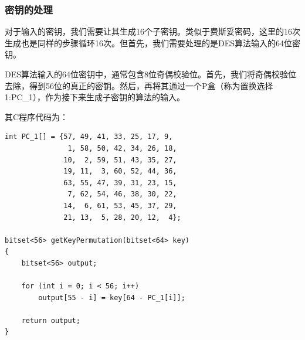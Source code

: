 \subsubsection{密钥的处理}
对于输入的密钥，我们需要让其生成16个子密钥。类似于费斯妥密码，这里的16次生成也是同样的步骤循环16次。但首先，我们需要处理的是DES算法输入的64位密钥。\par
DES算法输入的64位密钥中，通常包含8位奇偶校验位。首先，我们将奇偶校验位去除，得到56位的真正的密钥。然后，再将其通过一个P盒（称为置换选择1:PC\_1），作为接下来生成子密钥的算法的输入。\par
其C程序代码为：
\begin{prove}
\begin{verbatim}
int PC_1[] = {57, 49, 41, 33, 25, 17, 9,
               1, 58, 50, 42, 34, 26, 18,
              10,  2, 59, 51, 43, 35, 27,
              19, 11,  3, 60, 52, 44, 36,
              63, 55, 47, 39, 31, 23, 15,
               7, 62, 54, 46, 38, 30, 22,
              14,  6, 61, 53, 45, 37, 29,
              21, 13,  5, 28, 20, 12,  4};

bitset<56> getKeyPermutation(bitset<64> key)
{
    bitset<56> output;

    for (int i = 0; i < 56; i++)
        output[55 - i] = key[64 - PC_1[i]];

    return output;
}
\end{verbatim}
\end{prove}
